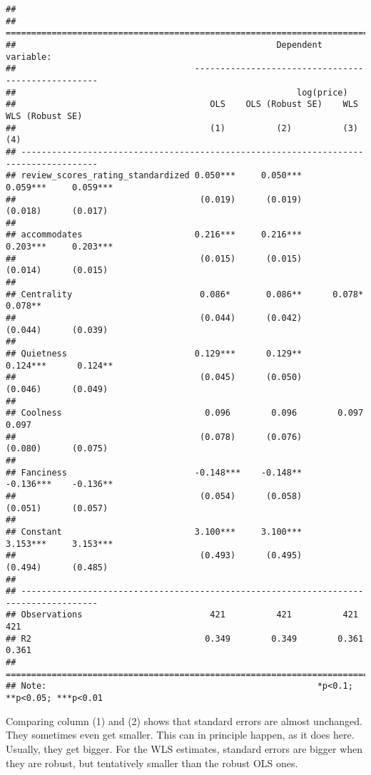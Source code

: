 \documentclass[
]{article}
\begin{document}
\begin{verbatim}
## 
## =====================================================================================
##                                                   Dependent variable:                
##                                   ---------------------------------------------------
##                                                       log(price)                     
##                                      OLS    OLS (Robust SE)    WLS    WLS (Robust SE)
##                                      (1)          (2)          (3)          (4)      
## -------------------------------------------------------------------------------------
## review_scores_rating_standardized 0.050***     0.050***     0.059***     0.059***    
##                                    (0.019)      (0.019)      (0.018)      (0.017)    
##                                                                                      
## accommodates                      0.216***     0.216***     0.203***     0.203***    
##                                    (0.015)      (0.015)      (0.014)      (0.015)    
##                                                                                      
## Centrality                         0.086*       0.086**      0.078*       0.078**    
##                                    (0.044)      (0.042)      (0.044)      (0.039)    
##                                                                                      
## Quietness                         0.129***      0.129**     0.124***      0.124**    
##                                    (0.045)      (0.050)      (0.046)      (0.049)    
##                                                                                      
## Coolness                            0.096        0.096        0.097        0.097     
##                                    (0.078)      (0.076)      (0.080)      (0.075)    
##                                                                                      
## Fanciness                         -0.148***    -0.148**     -0.136***    -0.136**    
##                                    (0.054)      (0.058)      (0.051)      (0.057)    
##                                                                                      
## Constant                          3.100***     3.100***     3.153***     3.153***    
##                                    (0.493)      (0.495)      (0.494)      (0.485)    
##                                                                                      
## -------------------------------------------------------------------------------------
## Observations                         421          421          421          421      
## R2                                  0.349        0.349        0.361        0.361     
## =====================================================================================
## Note:                                                     *p<0.1; **p<0.05; ***p<0.01
\end{verbatim}

Comparing column (1) and (2) shows that standard errors are almost
unchanged. They sometimes even get smaller. This can in principle
happen, as it does here. Usually, they get bigger. For the WLS
estimates, standard errors are bigger when they are robust, but
tentatively smaller than the robust OLS ones.
\end{document}
